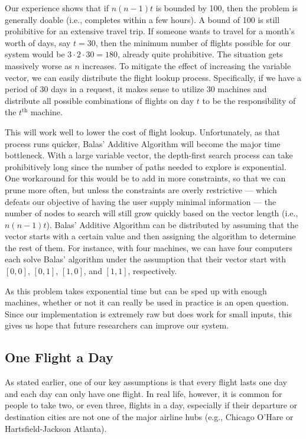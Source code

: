 \documentclass{article}
\begin{document}
Our experience shows that if $n(n-1)t$ is bounded by 100, then the problem is generally doable (i.e., completes within a few hours).
A bound of 100 is still prohibitive for an extensive travel trip. If someone wants to travel for a month's worth of days, say $t = 30$, then the
minimum number of flights possible for our system would be $3\cdot 2\cdot 30 = 180$, already quite prohibitive. The situation gets massively worse as
$n$ increases. To mitigate the effect of increasing the variable vector, we can easily distribute the flight lookup process. Specifically, if we have
a period of 30 days in a request, it makes sense to utilize 30 machines and distribute all possible combinations of flights on day $t$ to be the
responsibility of the $t^{\text{th}}$ machine.

This will work well to lower the cost of flight lookup. Unfortunately, as that process runs quicker, Balas' Additive Algorithm will become the major
time bottleneck. With a large variable vector, the depth-first search process can take prohibitively long since the number of paths needed to explore
is exponential. One workaround for this would be to add in more constraints, so that we can prune more often, but unless the constraints are overly
restrictive --- which defeats our objective of having the user supply minimal information --- the number of nodes to search will still grow quickly
based on the vector length (i.e., $n(n-1)t$). Balas' Additive Algorithm can be distributed by assuming that the vector starts with a certain value and
then assigning the algorithm to determine the rest of them. For instance, with four machines, we can have four computers each solve Balas' algorithm
under the assumption that their vector start with $[0,0]$, $[0,1]$, $[1,0]$, and $[1,1]$, respectively.

As this problem takes exponential time but can be sped up with enough machines, whether or not it can really be used in practice is an open question.
Since our implementation is extremely raw but does work for small inputs, this gives us hope that future researchers can improve our system.

\subsection{One Flight a Day}

As stated earlier, one of our key assumptions is that every flight lasts one day and each day can only have one flight. In real life, however, it is
common for people to take two, or even three, flights in a day, especially if their departure or destination cities are not one of the major airline
hubs (e.g., Chicago O'Hare or Hartsfield-Jackson Atlanta).
\end{document}
